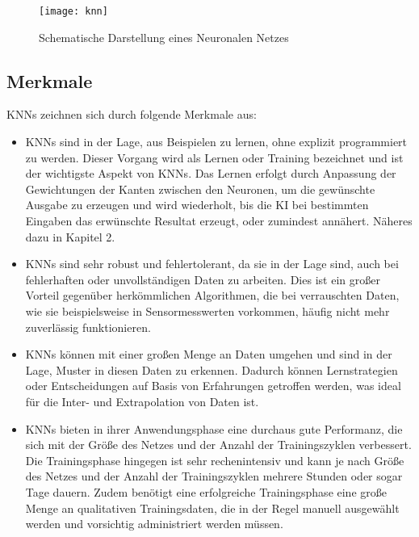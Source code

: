 \newpage


\begin{figure}[h]
    \centering
    \texttt{[image: knn]}
    \caption{Schematische Darstellung eines Neuronalen Netzes}
    \label{Abb:basic}
    \end{figure}

\subsection{Merkmale}

\noindent \acp{KNN} zeichnen sich durch folgende Merkmale aus:

\begin{itemize}
    \item \acp{KNN} sind in der Lage, aus Beispielen zu lernen, ohne explizit programmiert zu werden. Dieser Vorgang wird als Lernen oder Training bezeichnet und ist der wichtigste Aspekt von \acp{KNN}. Das Lernen erfolgt durch Anpassung der Gewichtungen der Kanten zwischen den Neuronen, um die gewünschte Ausgabe zu erzeugen und wird wiederholt, bis die KI bei bestimmten Eingaben das erwünschte Resultat erzeugt, oder zumindest annähert. Näheres dazu in Kapitel 2.
    \item \acp{KNN} sind sehr robust und fehlertolerant, da sie in der Lage sind, auch bei fehlerhaften oder unvollständigen Daten zu arbeiten. Dies ist ein großer Vorteil gegenüber herkömmlichen Algorithmen, die bei verrauschten Daten, wie sie beispielsweise in Sensormesswerten vorkommen, häufig nicht mehr zuverlässig funktionieren.
    \item \acp{KNN} können mit einer großen Menge an Daten umgehen und sind in der Lage, Muster in diesen Daten zu erkennen. Dadurch können Lernstrategien oder Entscheidungen auf Basis von Erfahrungen getroffen werden, was ideal für die Inter- und Extrapolation von Daten ist.
    \item \acp{KNN} bieten in ihrer Anwendungsphase eine durchaus gute Performanz, die sich mit der Größe des Netzes und der Anzahl der Trainingszyklen verbessert. Die Trainingsphase hingegen ist sehr rechenintensiv und kann je nach Größe des Netzes und der Anzahl der Trainingszyklen mehrere Stunden oder sogar Tage dauern. Zudem benötigt eine erfolgreiche Trainingsphase eine große Menge an qualitativen Trainingsdaten, die in der Regel manuell ausgewählt werden und vorsichtig administriert werden müssen.
    \end{itemize}
    

\newpage